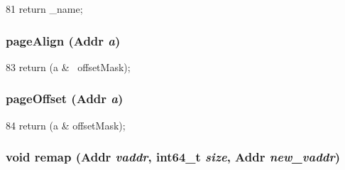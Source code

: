 \begin{DoxyCode}
81 { return _name; }
\end{DoxyCode}
\hypertarget{classPageTable_a38247c4bd6655c6c275b578bd72e63e4}{
\subsubsection[{pageAlign}]{ pageAlign ({\bf Addr} {\em a})}}
\label{classPageTable_a38247c4bd6655c6c275b578bd72e63e4}



\begin{DoxyCode}
83 { return (a & ~offsetMask); }
\end{DoxyCode}
\hypertarget{classPageTable_aea9a0188c4082f2d04b870ee4d03103c}{
\subsubsection[{pageOffset}]{ pageOffset ({\bf Addr} {\em a})}}
\label{classPageTable_aea9a0188c4082f2d04b870ee4d03103c}



\begin{DoxyCode}
84 { return (a &  offsetMask); }
\end{DoxyCode}
\hypertarget{classPageTable_a42230248f7e6b36d1d039334dfc8c73b}{
\subsubsection[{remap}]{\setlength{\rightskip}{0pt plus 5cm}void remap ({\bf Addr} {\em vaddr}, \/  int64\_\-t {\em size}, \/  {\bf Addr} {\em new\_\-vaddr})}}
\label{classPageTable_a42230248f7e6b36d1d039334dfc8c73b}



